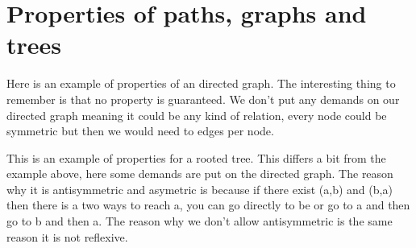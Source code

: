 \documentclass[twocolumn,a4paper]{article}
\begin{document}
\newpage
\section*{Properties of paths, graphs and trees}
Here is an example of properties of an directed graph.
The interesting thing to remember is that no property is guaranteed.
We don't put any demands on our directed graph meaning it could be any kind of relation,
every node could be symmetric but then we would need to edges per node.
\begin{figure}[ht]
	\centering
\end{figure}

This is an example of properties for a rooted tree.
This differs a bit from the example above, here some demands are put on the directed graph.
The reason why it is antisymmetric and asymetric is because if there exist (a,b) and (b,a) then there is a two ways to reach a,
you can go directly to be or go to a and then go to b and then a.
The reason why we don't allow antisymmetric is the same reason it is not reflexive.
\begin{figure}[ht]
	\centering
\end{figure}
\end{document}

